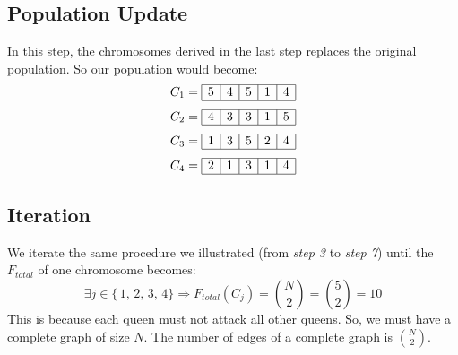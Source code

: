 \documentclass{article}
\begin{document}
    \subsection{Population Update}
    In this step, the chromosomes derived in the last step replaces the original population. So our population would become:
    $$ C_1 = 
        \begin{array}{|c|c|c|c|c|}
            \hline
            5&4&5&1&4 \\\hline
        \end{array}
    $$
    $$ C_2 = 
        \begin{array}{|c|c|c|c|c|}
            \hline
            4&3&3&1&5 \\\hline
        \end{array}
    $$
    $$ C_3 = 
        \begin{array}{|c|c|c|c|c|}
            \hline
            1&3&5&2&4 \\\hline
        \end{array}
    $$
    $$ C_4 = 
        \begin{array}{|c|c|c|c|c|}
            \hline
            2&1&3&1&4 \\\hline
        \end{array}
    $$
    \subsection{Iteration}
    We iterate the same procedure we illustrated (from \textit{step 3} to \textit{step 7}) until the $ F_{total} $ of one chromosome becomes:
    \[ \exists j \in \{\,1, \, 2, \, 3, \, 4\} \Rightarrow  F_{total}(C_j) = \binom{N}{2} = \binom{5}{2} = 10 \]
    This is because each queen must not attack all other queens. So, we must have a complete graph of size $ N $. The number of edges of a complete graph is $ \binom{N}{2} $.
\end{document}
